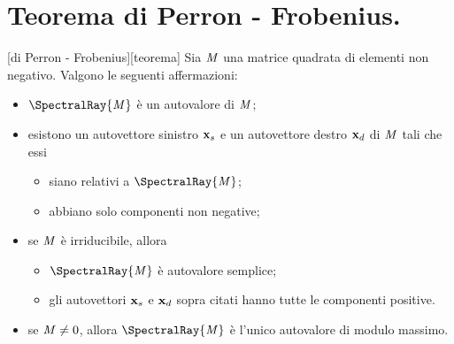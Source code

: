\section{Teorema di Perron - Frobenius.}\label{PerronFrobenius}
\begin{Theorem}
	[di Perron - Frobenius][teorema] Sia $\mathit{M}$ una matrice quadrata di elementi non negativo. Valgono le seguenti affermazioni:
	\begin{itemize}
		\item $\SpectralRay{\Matrix}$ \`e un autovalore di $\mathit{M}$;
		\item esistono un autovettore sinistro $\Eigenvector_s$ e un autovettore destro $\Eigenvector_d$ di $\mathit{M}$ tali che essi
			\begin{itemize}
				\item siano relativi a $\SpectralRay{\Matrix}$;
				\item abbiano solo componenti non negative;
			\end{itemize}
		\item se $\mathit{M}$ \`e irriducibile, allora
			\begin{itemize}
				\item $\SpectralRay{\Matrix}$ \`e autovalore semplice;
				\item gli autovettori $\Eigenvector_s$ e $\Eigenvector_d$ sopra citati hanno tutte le componenti positive.
			\end{itemize}
		\item se $\mathit{M} \neq 0$, allora $\SpectralRay{\Matrix}$ \`e l'unico autovalore di modulo massimo.
	\end{itemize}
\end{Theorem}
